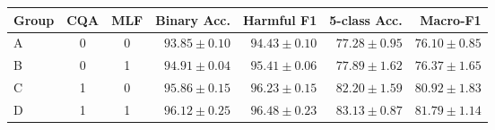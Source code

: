 \begin{tabular}{lccrrrr}
\toprule
Group & CQA & MLF & Binary Acc. & Harmful F1 & 5-class Acc. & Macro-F1 \\
\midrule
A & 0 & 0 & $93.85 \pm 0.10$ & $94.43 \pm 0.10$ & $77.28 \pm 0.95$ & $76.10 \pm 0.85$ \\
B & 0 & 1 & $94.91 \pm 0.04$ & $95.41 \pm 0.06$ & $77.89 \pm 1.62$ & $76.37 \pm 1.65$ \\
C & 1 & 0 & $95.86 \pm 0.15$ & $96.23 \pm 0.15$ & $82.20 \pm 1.59$ & $80.92 \pm 1.83$ \\
D & 1 & 1 & $96.12 \pm 0.25$ & $96.48 \pm 0.23$ & $83.13 \pm 0.87$ & $81.79 \pm 1.14$ \\
\bottomrule
\end{tabular}
